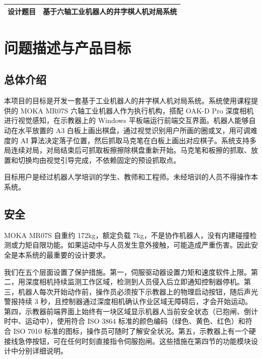 \documentclass[a4paper, 12pt, oneside]{ctexart}
\begin{document}
\pagestyle{empty}

{
\noindent 
\renewcommand{\arraystretch}{1.5}
\begin{tabularx}{\textwidth}{|p{3cm}|X|}
    \hline
    \centering \textbf{设计题目} & 基于六轴工业机器人的井字棋人机对局系统 \\
    \hline
\end{tabularx}
}

\section{问题描述与产品目标}

\subsection*{总体介绍}

本项目的目标是开发一套基于工业机器人的井字棋人机对局系统。系统使用课程提供的 MOKA MR07S 六轴工业机器人作为执行机构，搭配 OAK-D Pro 深度相机进行视觉感知，在示教器上的 Windows 平板端运行前端交互界面。机器人能够自动在水平放置的 A3 白板上画出棋盘，通过视觉识别用户所画的圈或叉，用可调难度的 AI 算法决定落子位置，然后抓取马克笔在白板上画出对应棋子。系统支持多局连续对局，对局结束后可抓取板擦擦除棋盘重新开始。马克笔和板擦的抓取、放置和切换均由视觉引导完成，不依赖固定的预设抓取点。

目标用户是经过机器人学培训的学生、教师和工程师。未经培训的人员不得操作本系统。

\subsection*{安全}

MOKA MR07S 自重约 172kg，额定负载 7kg，不是协作机器人，没有内建碰撞检测或力矩自限功能。如果运动中与人员发生意外接触，可能造成严重伤害。因此安全是本系统的最重要的设计要求。

我们在五个层面设置了保护措施。第一，伺服驱动器设置力矩和速度软件上限。第二，用深度相机持续监测工作区域，检测到人员侵入后立即通知控制器停机。第三，机器人每次开始动作前，操作员必须按下示教器上的物理启动按钮，随后声光警报持续 3 秒，且控制器通过深度相机确认作业区域无障碍后，才会开始运动。第四，示教器前端界面上始终有一块区域显示机器人当前安全状态（已抱闸、倒计时中、运动中），使用符合 ISO 3864 标准的颜色编码（绿色、黄色、红色）和符合 ISO 7010 标准的图标，操作员可随时了解安全状况。第五，示教器上有一个硬接线急停按钮，可在任何时刻直接指令伺服抱闸。这些措施在第四节的功能模块设计中分别详细说明。
\end{document}
